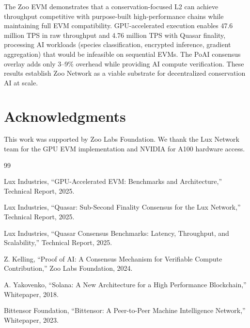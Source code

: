 \documentclass[11pt,letterpaper]{article}
\begin{document}
The Zoo EVM demonstrates that a conservation-focused L2 can achieve throughput competitive with purpose-built high-performance chains while maintaining full EVM compatibility. GPU-accelerated execution enables 47.6 million TPS in raw throughput and 4.76 million TPS with Quasar finality, processing AI workloads (species classification, encrypted inference, gradient aggregation) that would be infeasible on sequential EVMs. The PoAI consensus overlay adds only 3--9\% overhead while providing AI compute verification. These results establish Zoo Network as a viable substrate for decentralized conservation AI at scale.

\section*{Acknowledgments}

This work was supported by Zoo Labs Foundation. We thank the Lux Network team for the GPU EVM implementation and NVIDIA for A100 hardware access.


\begin{thebibliography}{99}

Lux Industries, ``GPU-Accelerated EVM: Benchmarks and Architecture,'' Technical Report, 2025.

Lux Industries, ``Quasar: Sub-Second Finality Consensus for the Lux Network,'' Technical Report, 2025.

Lux Industries, ``Quasar Consensus Benchmarks: Latency, Throughput, and Scalability,'' Technical Report, 2025.

Z. Kelling, ``Proof of AI: A Consensus Mechanism for Verifiable Compute Contribution,'' Zoo Labs Foundation, 2024.

A. Yakovenko, ``Solana: A New Architecture for a High Performance Blockchain,'' Whitepaper, 2018.

Bittensor Foundation, ``Bittensor: A Peer-to-Peer Machine Intelligence Network,'' Whitepaper, 2023.

\end{thebibliography}
\end{document}
